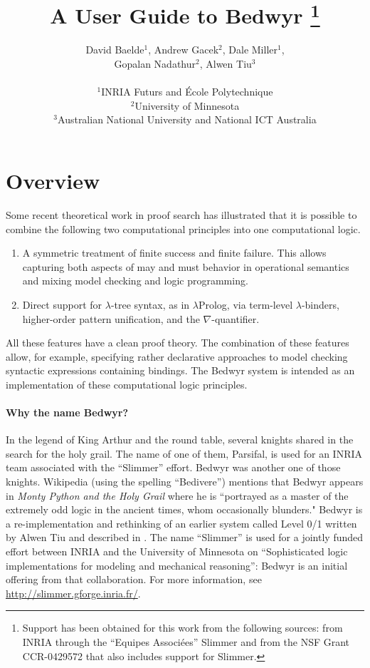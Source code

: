 \documentclass{article}
\title{{\Huge A User Guide to Bedwyr}
   \thanks{Support has been obtained for this work from the following
           sources: from INRIA through the ``Equipes Associ{\'e}es''
           Slimmer and from the NSF Grant CCR-0429572 that also
           includes support for Slimmer.}
}
\author{David Baelde$^1$, Andrew Gacek$^2$, Dale Miller$^1$, \\
        Gopalan Nadathur$^2$, Alwen Tiu$^3$  \\ \\
$^1$INRIA Futurs and \'Ecole Polytechnique\\
$^2$University of Minnesota\\
$^3$Australian National University and National ICT Australia
}
\begin{document}
\maketitle

\section{Overview}

Some recent theoretical work in proof search has illustrated that it
is possible to combine the following two computational principles into
one computational logic.
\begin{enumerate}
\item A symmetric treatment of finite success and finite failure.
  This allows capturing both aspects of may and must behavior in
  operational semantics and mixing model checking and logic programming.

\item Direct support for $\lambda$-tree syntax, as in $\lambda$Prolog,
       via term-level $\lambda$-binders, higher-order pattern
       unification, and the $\nabla$-quantifier.
\end{enumerate}
All these features have a clean proof theory.  The combination of
these features allow, for example, specifying rather declarative
approaches to model checking syntactic expressions containing
bindings.  The Bedwyr system is intended as an implementation of these
computational logic principles.


\paragraph{Why the name Bedwyr?}
In the legend of King Arthur and the round table, several knights
shared in the search for the holy grail.  The name of one of them,
Parsifal, is used for an INRIA team associated with the ``Slimmer''
effort.  Bedwyr was another one of those knights.  Wikipedia (using
the spelling ``Bedivere'') mentions that Bedwyr appears in {\em Monty
Python and the Holy Grail} where he is ``portrayed as a master of the
extremely odd logic in the ancient times, whom occasionally blunders."
Bedwyr is a re-implementation and rethinking of an earlier system
called Level 0/1 written by Alwen Tiu and described in
\cite{tiu05eshol}. The name ``Slimmer'' is used for a jointly funded
effort between INRIA and the University of Minnesota on
``Sophisticated logic implementations for modeling and mechanical
reasoning'': Bedwyr is an initial offering from
that collaboration.
For more information, see
\url{http://slimmer.gforge.inria.fr/}.
\end{document}
